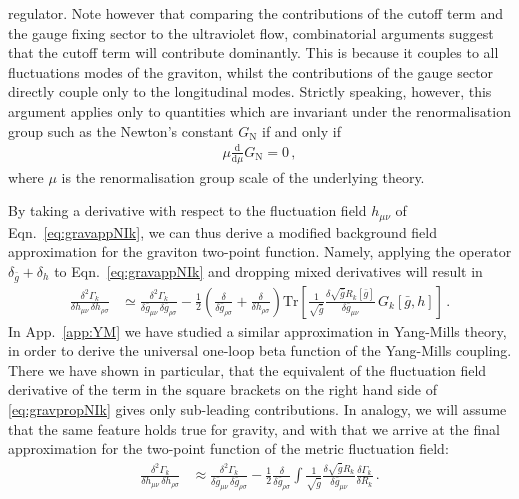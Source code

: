 \documentclass[11pt]{book}
\newcommand\GNewton{ G_{\scriptscriptstyle{\mathrm{N}}}{} }
\newcommand{\Tr}{\mathrm{Tr}}
\numberwithin{equation}{chapter}
\begin{document}
regulator.
Note however that comparing the contributions
of the cutoff term and the gauge fixing sector to the ultraviolet flow,
combinatorial arguments suggest that the cutoff term will contribute
dominantly.
This is because it couples to all fluctuations modes
of the graviton, whilst the contributions of the gauge sector
directly couple only to the longitudinal modes.
Strictly speaking, however, this argument applies only to
quantities which are invariant under the renormalisation group
such as the Newton's constant $\GNewton$ if and only if
\begin{align}
	\mu \frac{\mathrm d}{\mathrm d\mu} \GNewton = 0 \,,
\end{align}
where $\mu$ is the renormalisation group scale of the underlying
theory.

By taking a derivative with respect to the fluctuation field
$h_{\mu\nu}$ of Eqn.~\eqref{eq:gravappNIk}, we can thus
derive a modified background field approximation for the
graviton two-point function.
Namely, applying the operator $\delta_{\bar g} + \delta_h$
to Eqn.~\eqref{eq:gravappNIk}
and dropping mixed derivatives will result in
\begin{align}
  \frac{\delta^2 \Gamma_k}{\delta h_{\mu\nu} \, \delta h_{\rho\sigma}}&\simeq
  \frac{\delta^2 \Gamma_k}{\delta \bar g_{\mu\nu} \, \delta \bar g_{\rho\sigma}}
  -\frac 12 \left(\frac{\delta}{\delta\bar g_{\rho\sigma}}+\frac{\delta}{\delta h_{\rho\sigma}}
  \right) \Tr\left[ \frac{1}{\sqrt{\bar g}}\frac{\delta \sqrt{\bar g} R_k[\bar g]}{\delta \bar g_{\mu\nu}}
  \, G_k[\bar g, h]\right] \,.
  \label{eq:gravpropNIk}
\end{align}
In App.~\ref{app:YM} we have studied a similar approximation in
Yang-Mills theory, in order to derive the universal one-loop beta
function of the Yang-Mills coupling.
There we have shown in particular, that the equivalent of the fluctuation field derivative
of the term in the square brackets on the right hand side of
\eqref{eq:gravpropNIk} gives only sub-leading contributions.
In analogy, we will assume that the same feature holds true for
gravity, and with that we arrive at the final approximation for
the two-point function of the metric fluctuation field:
\begin{align} \label{eq:modback}
	\frac{\delta^2 \Gamma_k}{\delta h_{\mu\nu} \, \delta h_{\rho\sigma}} &\approx
  \frac{\delta^2 \Gamma_k}{\delta \bar g_{\mu\nu} \, \delta \bar g_{\rho\sigma}}
	- \frac 12 \frac{\delta}{\delta \bar g_{\rho\sigma}} \int \frac{1}{\sqrt{\bar g}}\frac{\delta \sqrt{\bar g} R_k}{\delta \bar g_{\mu\nu}}\frac{\delta
	\Gamma_k}{\delta R_k} \,.
\end{align}
\end{document}
